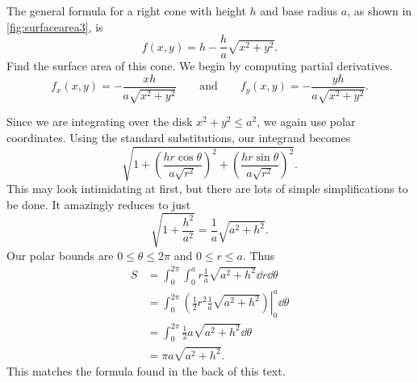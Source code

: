 \begin{example}\label{ex_surfacearea3}%
The general formula for a right cone with height $h$ and base radius $a$, as shown in \autoref{fig:surfacearea3}, is
%
%
\[f(x,y) = h-\frac{h}a\sqrt{x^2+y^2}.\]
Find the surface area of this cone.
\solution
We begin by computing partial derivatives. 
\[
f_x(x,y) = -\frac{xh}{a\sqrt{x^2+y^2}}
\qquad\text{and}\qquad
f_y(x,y) = -\frac{yh}{a\sqrt{x^2+y^2}}.
\]

Since we are integrating over the disk $x^2+y^2\le a^2$, we again use polar coordinates. Using the standard substitutions, our integrand becomes
\[\sqrt{1+ \left(\frac{hr\cos\theta}{a\sqrt{r^2}}\right)^2 + \left(\frac{hr\sin\theta}{a\sqrt{r^2}}\right)^2}.\]
This may look intimidating at first, but there are lots of simple simplifications to be done. It amazingly reduces to just
\[\sqrt{1+\frac{h^2}{a^2}} = \frac1a\sqrt{a^2+h^2}.\]
Our polar bounds are $0\leq\theta\leq2\pi$ and $0\leq r\leq a$. Thus
\begin{align*}
S &=	\int_0^{2\pi}\int_0^ar\frac1a\sqrt{a^2+h^2}\dd r\dd\theta\\
	&= \int_0^{2\pi} \left.\left(\frac12r^2\frac1a\sqrt{a^2+h^2}\right)\right|_0^a\dd\theta \\
	&=	\int_0^{2\pi} \frac12a\sqrt{a^2+h^2} \dd\theta\\
	&= \pi a\sqrt{a^2+h^2}.
\end{align*}
This matches the formula found in the back of this text.
\end{example}

